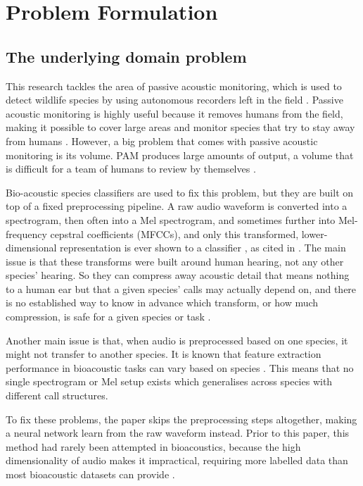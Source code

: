 \documentclass[11pt]{article}
\begin{document}
\setcounter{page}{1}

\section{Problem Formulation}

\subsection{The underlying domain problem}

This research tackles the area of passive acoustic monitoring, which is used to detect wildlife species by using autonomous recorders left in the field \citep{bravosanchez2021}. Passive acoustic monitoring is highly useful because it removes humans from the field, making it possible to cover large areas and monitor species that try to stay away from humans \citep{digby2013, darras2019}. However, a big problem that comes with passive acoustic monitoring is its volume. PAM produces large amounts of output, a volume that is difficult for a team of humans to review by themselves \citep{campos2019}.

Bio-acoustic species classifiers are used to fix this problem, but they are built on top of a fixed preprocessing pipeline. A raw audio waveform is converted into a spectrogram, then often into a Mel spectrogram, and sometimes further into Mel-frequency cepstral coefficients (MFCCs), and only this transformed, lower-dimensional representation is ever shown to a classifier \cite{stowellplumbley2014}, as cited in \cite{bravosanchez2021}. The main issue is that these transforms were built around human hearing, not any other species' hearing. So they can compress away acoustic detail that means nothing to a human ear but that a given species' calls may actually depend on, and there is no established way to know in advance which transform, or how much compression, is safe for a given species or task \cite{bravosanchez2021}.

Another main issue is that, when audio is preprocessed based on one species, it might not transfer to another species. It is known that feature extraction performance in bioacoustic tasks can vary based on species \citep{bravosanchez2021}. This means that no single spectrogram or Mel setup exists which generalises across species with different call structures.

To fix these problems, the paper skips the preprocessing steps altogether, making a neural network learn from the raw waveform instead. Prior to this paper, this method had rarely been attempted in bioacoustics, because the high dimensionality of audio makes it impractical, requiring more labelled data than most bioacoustic datasets can provide \citep{bravosanchez2021}.
\end{document}
